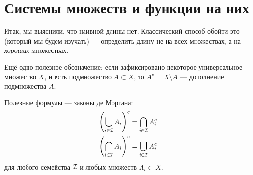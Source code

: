 \section{Системы множеств и функции на них}

Итак, мы выяснили, что наивной длины нет. Классический способ обойти это (который мы будем изучать) --- определить длину не на всех множествах, а на \textit{хороших} множествах.

\begin{notatn*}
 Ещё одно полезное обозначение: если зафиксировано некоторое универсальное множество $X$, и есть подмножество $A \subset X$, то $A^{c} = X \setminus A$ --- дополнение подмножества $A$.
\end{notatn*}

\begin{prop*}
 Полезные формулы --- законы де Моргана:
 \begin{align*}
  \left( \bigcup_{i \in \mathcal{I}} A_i \right)^c &= \bigcap_{i \in \mathcal{I}} A_i^c \\
  \left( \bigcap_{i \in \mathcal{I}} A_i \right)^c &= \bigcup_{i \in \mathcal{I}} A_i^c
 \end{align*} для любого семейства $ \mathcal{I} $ и любых множеств $ A_i \subset X $.
\end{prop*}

